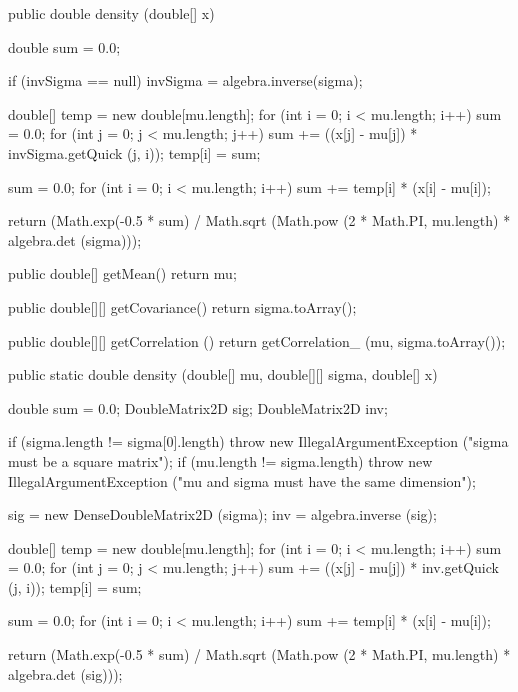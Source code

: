 \begin{code}\begin{hide}

   public double density (double[] x) {
      double sum = 0.0;

      if (invSigma == null)
         invSigma = algebra.inverse(sigma);

      double[] temp = new double[mu.length];
      for (int i = 0; i < mu.length; i++)
      {
         sum = 0.0;
         for (int j = 0; j < mu.length; j++)
            sum += ((x[j] - mu[j]) * invSigma.getQuick (j, i));
         temp[i] = sum;
      }

      sum = 0.0;
      for (int i = 0; i < mu.length; i++)
         sum += temp[i] * (x[i] - mu[i]);

      return (Math.exp(-0.5 * sum) / Math.sqrt (Math.pow (2 * Math.PI, mu.length) * algebra.det (sigma)));
   }

   public double[] getMean() {
      return mu;
   }

   public double[][] getCovariance() {
      return sigma.toArray();
   }

   public double[][] getCorrelation () {
      return getCorrelation_ (mu, sigma.toArray());
   }\end{hide}

   public static double density (double[] mu, double[][] sigma, double[] x)\begin{hide} {
      double sum = 0.0;
      DoubleMatrix2D sig;
      DoubleMatrix2D inv;

      if (sigma.length != sigma[0].length)
         throw new IllegalArgumentException ("sigma must be a square matrix");
      if (mu.length != sigma.length)
         throw new IllegalArgumentException ("mu and sigma must have the same dimension");

      sig = new DenseDoubleMatrix2D (sigma);
      inv = algebra.inverse (sig);

      double[] temp = new double[mu.length];
      for (int i = 0; i < mu.length; i++)
      {
         sum = 0.0;
         for (int j = 0; j < mu.length; j++)
            sum += ((x[j] - mu[j]) * inv.getQuick (j, i));
         temp[i] = sum;
      }

      sum = 0.0;
      for (int i = 0; i < mu.length; i++)
         sum += temp[i] * (x[i] - mu[i]);

      return (Math.exp(-0.5 * sum) / Math.sqrt (Math.pow (2 * Math.PI, mu.length) * algebra.det (sig)));
   }\end{hide}
\end{code}
